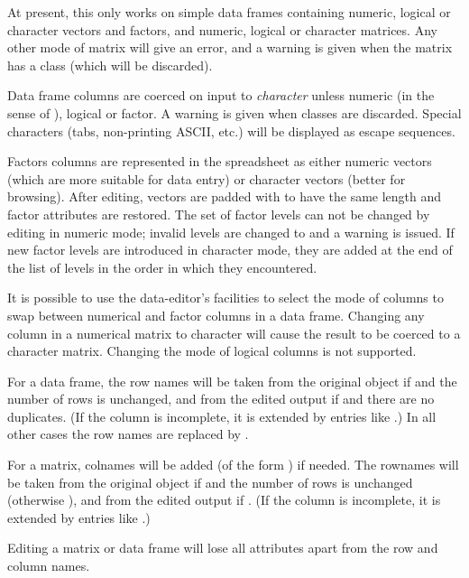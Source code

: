 \begin{Details}\relax
At present, this only works on simple data frames containing numeric,
logical or character vectors and factors, and numeric, logical or
character matrices.  Any other mode of matrix will give an error, and
a warning is given when the matrix has a class (which will be discarded).

Data frame columns are coerced on input to \emph{character} unless
numeric (in the sense of ), logical or factor.  A
warning is given when classes are discarded.  Special characters
(tabs, non-printing ASCII, etc.) will be displayed as escape sequences.

Factors columns are represented in the spreadsheet as either numeric
vectors (which are more suitable for data entry) or character vectors
(better for browsing). After editing, vectors are padded with
 to have the same length and factor attributes are restored.
The set of factor levels can not be changed by editing in numeric
mode; invalid levels are changed to  and a warning is issued.
If new factor levels are introduced in character mode, they are added
at the end of the list of levels in the order in which they
encountered.

It is possible to use the data-editor's facilities to select the mode
of columns to swap between numerical and factor columns in a data
frame.  Changing any column in a numerical matrix to character will
cause the result to be coerced to a character matrix.  Changing 
the mode of logical columns is not supported.

For a data frame, the row names will be taken from the original object
if  and the number of rows is unchanged,
and from the edited output if  and there
are no duplicates.  (If the  column is incomplete, it
is extended by entries like .)  In all other cases the
row names are replaced by .

For a matrix, colnames will be added (of the form ) if
needed.  The rownames will be taken from the original object if
 and the number of rows is unchanged
(otherwise ), and from the edited output if
.  (If the  column is
incomplete, it is extended by entries like .)

Editing a matrix or data frame will lose all attributes apart from the
row and column names.
\end{Details}
